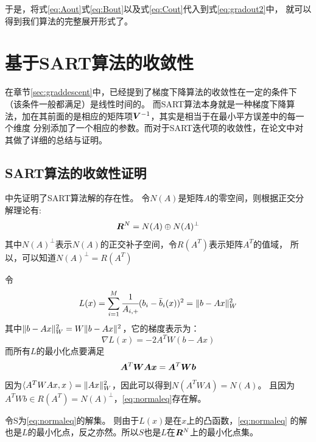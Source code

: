 于是，将式\eqref{eq:Aout}式\eqref{eq:Bout}以及式\eqref{eq:Cout}代入到式\eqref{eq:gradout2}中，
就可以得到我们算法的完整展开形式了。



\section{基于SART算法的收敛性}

在章节\ref{sec:graddescent}中，已经提到了梯度下降算法的收敛性在一定的条件下（该条件一般都满足）是线性时间的。
而SART算法本身就是一种梯度下降算法，加在其前面的是相应的矩阵项$\bm{V}^{-1}$，其实是相当于在最小平方误差中的每一个维度
分别添加了一个相应的参数。而对于SART迭代项的收敛性，在论文\cite{jiang2003convergence}中对其做了详细的总结与证明。

\subsection{SART算法的收敛性证明}
\cite{jiang2003convergence}中先证明了SART算法解的存在性。
令$N(A)$是矩阵$A$的零空间，则根据正交分解理论有:
\begin{equation*}
\bm{R}^N=N(A)\oplus N(A)^\perp
\end{equation*}
其中$N(A)^\perp$表示$N(A)$的正交补子空间，令$R(A^T)$表示矩阵$A^T$的值域，
所以，可以知道$N(A)^\perp=R(A^T)$

令
\begin{equation*}
L(x)=\sum_{i=1}^M\cfrac{1}{A_{i,+}}(b_i-\bar{b}_i(x))^2=\lVert b-Ax\rVert^2_W
\end{equation*}
其中$\lVert b-Ax\rVert^2_W = W\lVert b-Ax\rVert^2$，它的梯度表示为：
\begin{equation*}
\nabla L(x)=-2A^TW(b-Ax)
\end{equation*}
而所有$L$的最小化点要满足
\begin{equation}\label{eq:normaleq}
\bm{A}^T\bm{W}\bm{A}\bm{ x}=\bm{A}^T\bm{W}\bm{b}
\end{equation}
因为$\langle A^TWAx,x\ \rangle=\lVert Ax\rVert^2_W$，因此可以得到$N(A^TWA)=N(A)$。
且因为$A^TWb\in R(A^T) = N(A)^\perp$，\ref{eq:normaleq}存在解。

令S为\eqref{eq:normaleq}的解集。
则由于$L(x)$是在$x$上的凸函数，\eqref{eq:normaleq}
的解也是$L$的最小化点，反之亦然。所以$S$也是$L$在$\bm{R}^N$上的最小化点集。

